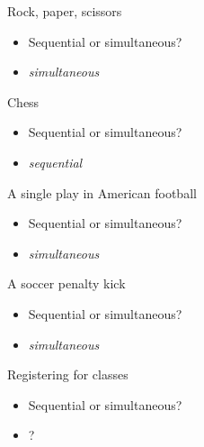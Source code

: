 \documentclass[10pt]{beamer}
\begin{document}
\begin{frame}[label={sec:orgbe93422}]{}
\alert{Rock, paper, scissors}
\begin{itemize}
\item Sequential or simultaneous?
\end{itemize}
\begin{itemize}
\item \emph{simultaneous}
\end{itemize}
\end{frame}

\begin{frame}[label={sec:org8305a0b}]{}
\alert{Chess}
\begin{itemize}
\item Sequential or simultaneous?
\end{itemize}
\begin{itemize}
\item \emph{sequential}
\end{itemize}
\end{frame}

\begin{frame}[label={sec:org594806d}]{}
\alert{A single play in American football}
\begin{itemize}
\item Sequential or simultaneous?
\end{itemize}
\begin{itemize}
\item \emph{simultaneous}
\end{itemize}
\end{frame}

\begin{frame}[label={sec:org777333b}]{}
\alert{A soccer penalty kick}
\begin{itemize}
\item Sequential or simultaneous?
\end{itemize}
\begin{itemize}
\item \emph{simultaneous}
\end{itemize}
\end{frame}

\begin{frame}[label={sec:org4ac8daa}]{}
\alert{Registering for classes}
\begin{itemize}
\item Sequential or simultaneous?
\end{itemize}
\begin{itemize}
\item ?
\end{itemize}
\end{frame}
\end{document}
